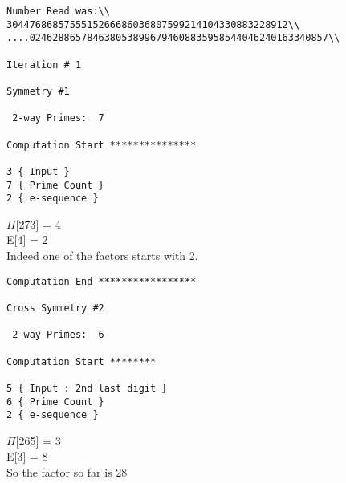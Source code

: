 \begin{verbatim}
Number Read was:\\
3044768685755515266686036807599214104330883228912\\
....0246288657846380538996794608835958544046240163340857\\

Iteration #	1

Symmetry #1

 2-way Primes: 	7

Computation Start ***************

3 { Input }
7 { Prime Count }
2 { e-sequence }

\end {verbatim}
$\Pi$[273] = 4 \\
E[4] = 2 \\
Indeed one of the factors starts with 2. \\
\begin {verbatim}
Computation End *****************

Cross Symmetry #2

 2-way Primes: 	6

Computation Start ********

5 { Input : 2nd last digit }
6 { Prime Count }
2 { e-sequence } 

\end{verbatim}
$\Pi$[265] = 3 \\
E[3] = 8 \\
So the factor so far is { 28 }
